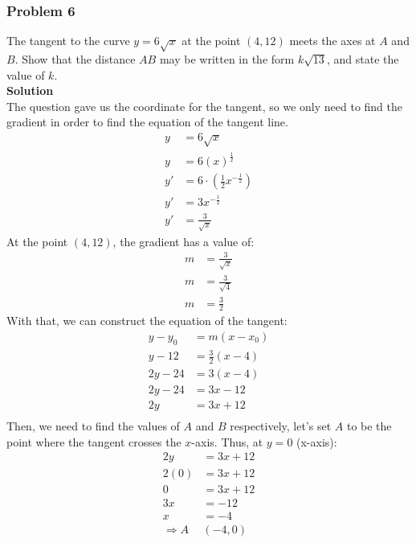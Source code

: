 \documentclass[hidelinks, a4paper, 12pt]{article}
\newcommand{\bd}{\textbf}
\newcommand{\n}{\\[\baselineskip]}
\newcommand{\thus}{\Rightarrow}
\begin{document}
            \subsubsection{Problem 6}
                The tangent to the curve $y = 6\sqrt{x}$ at the point $(4, 12)$ meets the axes at $A$ and $B$. 
                Show that the distance $AB$ may be written in the form $k\sqrt{13}$, and state the value of $k$.\n
                \bd{Solution}\n
                The question gave us the coordinate for the tangent, so we only need to find the gradient in order to find the 
                equation of the tangent line.
                \[\begin{split}
                    y &= 6\sqrt{x}\\
                    y &= 6(x)^{\frac{1}{2}}\\
                    y' &= 6\cdot\left(\frac{1}{2}x^{-\frac{1}{2}}\right)\\
                    y' &= 3x^{-\frac{1}{2}}\\
                    y' &= \frac{3}{\sqrt{x}}
                \end{split}\]
                At the point $(4, 12)$, the gradient has a value of:
                \[\begin{split}
                    m &= \frac{3}{\sqrt{x}}\\
                    m &= \frac{3}{\sqrt{4}}\\
                    m &= \frac{3}{2}
                \end{split}\]
                With that, we can construct the equation of the tangent:
                \[\begin{split}
                    y - y_0 &= m(x-x_0)\\
                    y - 12 &= \frac{3}{2}(x-4)\\
                    2y - 24 &= 3(x-4)\\
                    2y - 24 &= 3x - 12\\
                    2y &= 3x +12\\
                \end{split}\]
                Then, we need to find the values of $A$ and $B$ respectively, let's set $A$ to be the point where the tangent crosses the $x$-axis.
                Thus, at $y = 0$ (x-axis):
                \[\begin{split}
                    2y &= 3x + 12\\
                    2(0) &= 3x + 12\\
                    0 &= 3x + 12\\
                    3x &= -12\\
                    x &= -4\\
                    \thus A &(-4, 0)
                \end{split}\]
\end{document}
